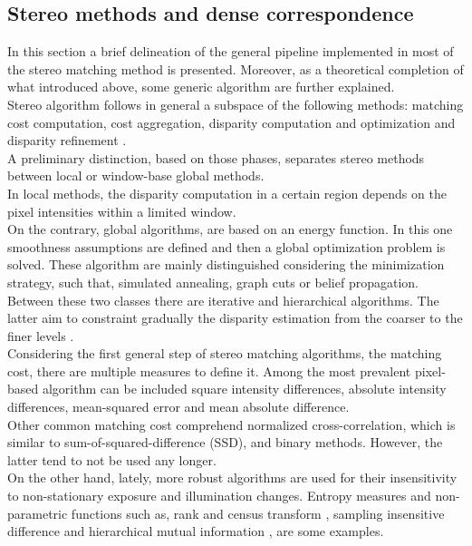 \subsection{Stereo methods and dense correspondence}
\label{stereomethods}
In this section a brief delineation of the general pipeline implemented in most of the stereo matching method is presented. 
Moreover, as a theoretical completion of what introduced above, some generic algorithm are further explained.\\
Stereo algorithm follows in general a subspace of the following methods: matching cost computation, cost aggregation, disparity computation and optimization and disparity refinement \citep{Scharstein2001}.\\
A preliminary distinction, based on those phases, separates stereo methods between local or window-base global methods.\\
In local methods, the disparity computation in a certain region depends on the pixel intensities within a limited window.\\
On the contrary, global algorithms, are based on an energy function.
In this one smoothness assumptions are defined and then a global optimization problem is solved. 
These algorithm are mainly distinguished considering the minimization strategy, such that, simulated annealing, graph cuts or belief propagation.\\
Between these two classes there are iterative and hierarchical algorithms. 
The latter aim to constraint gradually the disparity estimation from the coarser to the finer levels \citep{Hirschmuller2008}.\\
Considering the first general step of stereo matching algorithms, the matching cost, there are multiple measures to define it.
Among the most prevalent pixel-based algorithm can be included square intensity differences, absolute intensity differences, mean-squared error and mean absolute difference.\\
Other common matching cost comprehend normalized cross-correlation, which is similar to sum-of-squared-difference (SSD), and binary methods. 
However, the latter tend to not be used any longer. \\
On the other hand, lately, more robust algorithms are used for their insensitivity to non-stationary exposure and illumination changes. 
Entropy measures and non-parametric functions such as, rank and census transform \citep{Zabih1994}, sampling insensitive difference\citep{Birchfield1999} and hierarchical mutual information \citep{Hirschmuller2008}, are some examples.
